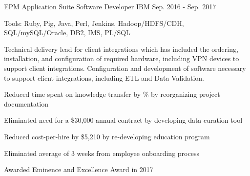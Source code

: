 \begin{cventries}
  \cvexpentry
    {EPM Application Suite} %
    {Software Developer} %
    {IBM}
    {Sep. 2016 - Sep. 2017}
    {
      \begin{cvheavyparagraph}
        Tools: Ruby, Pig, Java, Perl, Jenkins, Hadoop/HDFS/CDH, SQL/mySQL/Oracle, DB2, IMS, PL/SQL
      \end{cvheavyparagraph}
    }
    {
      \begin{cvparagraph}
        Technical delivery lead for client integrations which has included the ordering, installation, and configuration of required hardware, including VPN devices to support client integrations.  Configuration and development of software necessary to support client integrations, including ETL and Data Validation.
      \end{cvparagraph}
      \begin{cvitems} %
        \item {Reduced time spent on knowledge transfer by \% by reorganizing project documentation}
        \item {Eliminated need for a \$30,000 annual contract by developing data curation tool}
        \item {Reduced cost-per-hire by \$5,210 by re-developing education program}
        \item {Eliminated average of 3 weeks from employee onboarding process}
        \item {Awarded Eminence and Excellence Award in 2017}
      \end{cvitems}
    }


\end{cventries}
